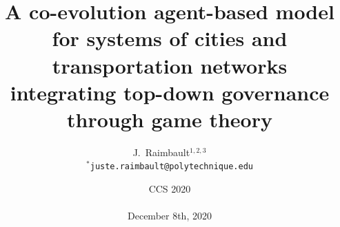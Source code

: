 



\title
[A co-evolution ABM for systems of cities]{A co-evolution agent-based model for systems of cities and transportation networks integrating top-down governance through game theory}
\author[Raimbault]{J.~Raimbault$^{1,2,3}$\\\medskip
$^{\ast}$\texttt{juste.raimbault@polytechnique.edu}
}





\date[08/12/2020]{CCS 2020\\
\\
December 8th, 2020
}

\frame{\maketitle}


